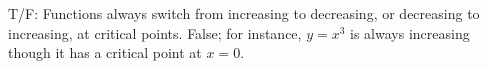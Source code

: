 {T/F: Functions always switch from increasing to decreasing, or decreasing to increasing, at critical points.
}
{False; for instance, $y=x^3$ is always increasing though it has a critical point at $x=0$.
}
